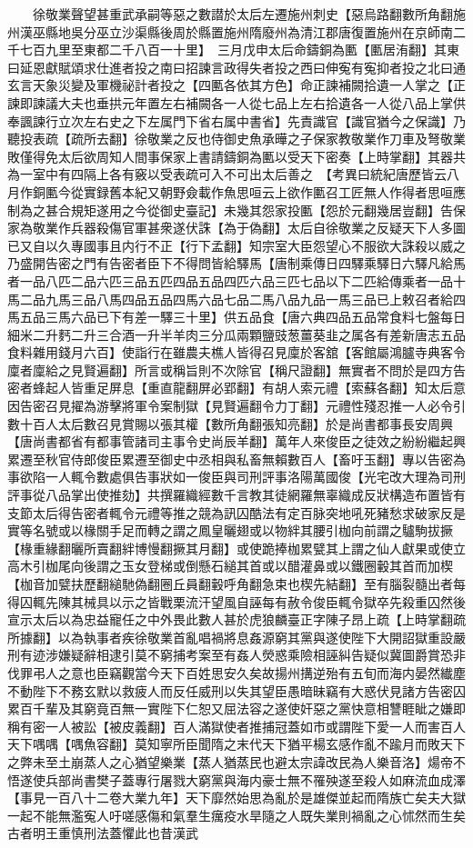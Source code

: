 　　徐敬業聲望甚重武承嗣等惡之數譛於太后左遷施州刺史【惡烏路翻數所角翻施州漢巫縣地吳分巫立沙渠縣後周於縣置施州隋廢州為清江郡唐復置施州在京師南二千七百九里至東都二千八百一十里】　三月戊申太后命鑄銅為匭【匭居洧翻】其東曰延恩獻賦頌求仕進者投之南曰招諫言政得失者投之西曰伸寃有寃抑者投之北曰通玄言天象災變及軍機祕計者投之【四匭各依其方色】命正諫補闕拾遺一人掌之【正諫即諫議大夫也垂拱元年置左右補闕各一人從七品上左右拾遺各一人從八品上掌供奉諷諫行立次左右史之下左属門下省右属中書省】先責識官【識官猶今之保識】乃聽投表疏【疏所去翻】徐敬業之反也侍御史魚承曄之子保家教敬業作刀車及弩敬業敗僅得免太后欲周知人間事保家上書請鑄銅為匭以受天下密奏【上時掌翻】其器共為一室中有四隔上各有竅以受表疏可入不可出太后善之　【考異曰統紀唐歷皆云八月作銅匭今從實録舊本紀又朝野僉載作魚思咺云上欲作匭召工匠無人作得者思咺應制為之甚合規矩遂用之今從御史臺記】未幾其怨家投匭【怨於元翻幾居豈翻】告保家為敬業作兵器殺傷官軍甚衆遂伏誅【為于偽翻】太后自徐敬業之反疑天下人多圖已又自以久專國事且内行不正【行下孟翻】知宗室大臣怨望心不服欲大誅殺以威之乃盛開告密之門有告密者臣下不得問皆給驛馬【唐制乘傳日四驛乘驛日六驛凡給馬者一品八匹二品六匹三品五匹四品五品四匹六品三匹七品以下二匹給傳乘者一品十馬二品九馬三品八馬四品五品四馬六品七品二馬八品九品一馬三品已上敕召者給四馬五品三馬六品已下有差一驛三十里】供五品食【唐六典四品五品常食料七盤每日細米二升麫二升三合酒一升半羊肉三分瓜兩顆鹽豉葱薑葵韭之属各有差新唐志五品食料雜用錢月六百】使詣行在雖農夫樵人皆得召見廩於客舘【客館屬鴻臚寺典客令廩者廩給之見賢遍翻】所言或稱旨則不次除官【稱尺證翻】無實者不問於是四方告密者蜂起人皆重足屏息【重直龍翻屏必郢翻】有胡人索元禮【索蘇各翻】知太后意因告密召見擢為游擊將軍令案制獄【見賢遍翻令力丁翻】元禮性殘忍推一人必令引數十百人太后數召見賞賜以張其權【數所角翻張知亮翻】於是尚書都事長安周興【唐尚書都省有都事管諸司主事令史尚辰羊翻】萬年人來俊臣之徒效之紛紛繼起興累遷至秋官侍郎俊臣累遷至御史中丞相與私畜無賴數百人【畜吁玉翻】專以告密為事欲陷一人輒令數處俱告事狀如一俊臣與司刑評事洛陽萬國俊【光宅改大理為司刑評事從八品掌出使推劾】共撰羅織經數千言教其徒網羅無辜織成反狀構造布置皆有支節太后得告密者輒令元禮等推之競為訊囚酷法有定百脉突地吼死豬愁求破家反是實等名號或以椽關手足而轉之謂之鳳皇曬翅或以物絆其腰引枷向前謂之驢駒拔撅【椽重緣翻曬所賣翻絆博慢翻撅其月翻】或使跪捧枷累甓其上謂之仙人獻果或使立高木引枷尾向後謂之玉女登梯或倒懸石縋其首或以醋灌鼻或以鐵圈轂其首而加楔【枷音加甓扶歷翻縋馳偽翻圈丘員翻轂呼角翻急束也楔先結翻】至有腦裂髓出者每得囚輒先陳其械具以示之皆戰栗流汗望風自誣每有赦令俊臣輒令獄卒先殺重囚然後宣示太后以為忠益寵任之中外畏此數人甚於虎狼麟臺正字陳子昂上疏【上時掌翻疏所據翻】以為執事者疾徐敬業首亂唱禍將息姦源窮其黨與遂使陛下大開詔獄重設嚴刑有迹涉嫌疑辭相逮引莫不窮捕考案至有姦人熒惑乘險相誣糾告疑似冀圖爵賞恐非伐罪弔人之意也臣竊觀當今天下百姓思安久矣故揚州搆逆殆有五旬而海内晏然纎塵不動陛下不務玄默以救疲人而反任威刑以失其望臣愚暗昧竊有大惑伏見諸方告密囚累百千輩及其窮竟百無一實陛下仁恕又屈法容之遂使奸惡之黨快意相讐睚眦之嫌即稱有密一人被訟【被皮義翻】百人滿獄使者推捕冠蓋如市或謂陛下愛一人而害百人天下喁喁【喁魚容翻】莫知寧所臣聞隋之末代天下猶平楊玄感作亂不踰月而敗天下之弊未至土崩蒸人之心猶望樂業【蒸人猶蒸民也避太宗諱改民為人樂音洛】煬帝不悟遂使兵部尚書樊子蓋專行屠戮大窮黨與海内豪士無不罹殃遂至殺人如麻流血成澤【事見一百八十二卷大業九年】天下靡然始思為亂於是雄傑並起而隋族亡矣夫大獄一起不能無濫寃人吁嗟感傷和氣羣生癘疫水旱隨之人既失業則禍亂之心怵然而生矣古者明王重慎刑法蓋懼此也昔漢武